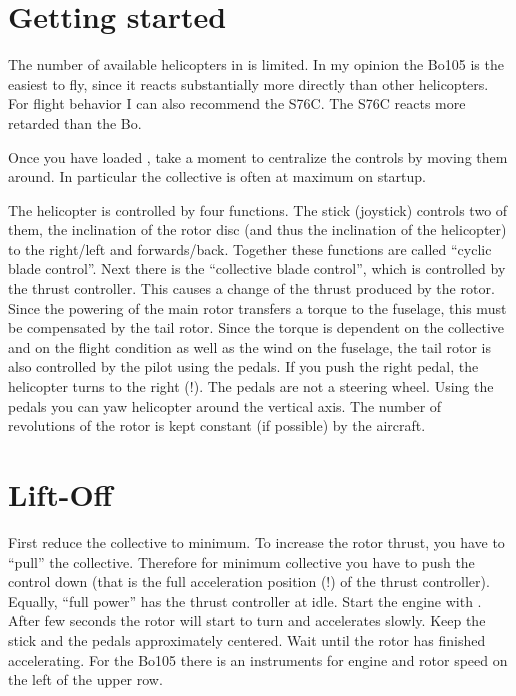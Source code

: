 \section{Getting started}

The number of available helicopters in \FlightGear{} is limited. In my opinion 
the Bo105 is the easiest to fly, since it reacts substantially more directly 
than other helicopters. For flight behavior I can also recommend the S76C. 
The S76C reacts more retarded than the Bo. 

Once you have loaded \FlightGear, take a moment to centralize the controls by 
moving them around. In particular the collective is often at maximum on startup. 


The helicopter is controlled by four functions. The stick (joystick) controls 
two of them, the inclination of the rotor disc (and thus the inclination of 
the helicopter) to the right/left and forwards/back. Together these functions 
are called ``cyclic blade control''. Next there is the ``collective blade 
control'', which is controlled by the thrust controller. This causes a change 
of the thrust produced by the rotor. Since the powering of the main rotor 
transfers a torque to the fuselage, this must be compensated by the 
tail rotor. Since the torque is dependent on the collective and on the flight 
condition as well as the wind on the fuselage, the tail rotor is also 
controlled by the pilot using the pedals. If you push the right pedal, 
the helicopter turns to the right (!). The pedals are not a steering wheel. 
Using the pedals you can yaw helicopter around the vertical axis. The 
number of revolutions of the rotor is kept constant (if possible) by the 
aircraft. 


\section{Lift-Off}

First reduce the collective to minimum. To increase the rotor thrust, you have 
to ``pull'' the collective. Therefore for minimum collective you have to push 
the control down (that is the full acceleration position (!) of the thrust 
controller). Equally, ``full power'' has the thrust controller at idle. 
Start the engine with \key{\}}. After few seconds the rotor will start to 
turn and accelerates slowly. Keep the stick and the pedals approximately 
centered. Wait until the rotor has finished accelerating. For the Bo105 there 
is an instruments for engine and rotor speed on the left of the upper row. 

